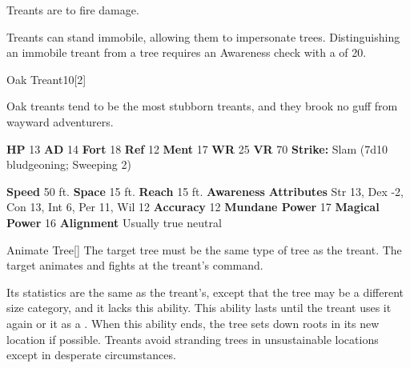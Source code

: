        Treants are  to fire damage.
      
        Treants can stand immobile, allowing them to impersonate trees.
        Distinguishing an immobile treant from a tree requires an Awareness check with a  of 20.
  

  \begin{monsubsection}{Oak Treant}{10}[2]
    \vspace{-1em}\vspace{-1em}
    \vspace{0em}

    
          Oak treants tend to be the most stubborn treants, and they brook no guff from wayward adventurers.
        

    \begin{spellcontent}
      \begin{spelltargetinginfo}
        \pari \textbf{HP} 13 \monsep
          \textbf{AD} 14 \monsep
          \textbf{Fort} 18 \monsep
          \textbf{Ref} 12 \monsep
          \textbf{Ment} 17
        \pari \textbf{WR} 25 \monsep
        \textbf{VR} 70
        \pari \textbf{Strike:}
            Slam  (7d10 bludgeoning; Sweeping 2)
      \end{spelltargetinginfo}
    \end{spellcontent}
    \begin{monsterfooter}
      \pari \textbf{Speed} 50 ft. \monsep
        \textbf{Space} 15 ft. \monsep
        \textbf{Reach} 15 ft.
      \pari \textbf{Awareness} 
      \pari \textbf{Attributes}
        Str 13, Dex -2,
        Con 13, Int 6,
        Per 11, Wil 12
      \pari \textbf{Accuracy} 12 \monsep
        \textbf{Mundane Power} 17 \monsep
      \textbf{Magical Power} 16
      \pari \textbf{Alignment} Usually true neutral
    \end{monsterfooter}
  \end{monsubsection}
  \begin{freeability}{Animate Tree}[]
      The target tree must be the same type of tree as the treant.
        The target animates and fights at the treant's command.

        Its statistics are the same as the treant's, except that the tree may be a different size category, and it lacks this ability.
        This ability lasts until the treant uses it again or  it as a .
        When this ability ends, the tree sets down roots in its new location if possible.
        Treants avoid stranding trees in unsustainable locations except in desperate circumstances.
    \end{freeability}
  
